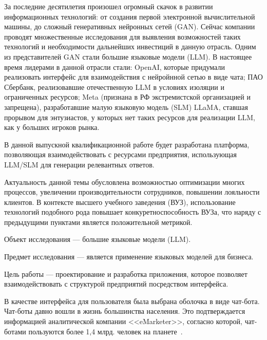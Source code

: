 







За последние десятилетия произошел огромный скачок в развитии информационных технологий:
от создания первой электронной вычислительной машины, до сложный генеративных
нейронных сетей (GAN). Сейчас компании проводят множественные исследования
для выявления возможностей таких технологий и необходимости дальнейших
инвестиций в данную отрасль. Одним из представителей GAN стали большие языковые
модели (LLM). В настоящее время лидерами в данной отрасли стали: OpenAI,
которые придумали реализовать интерфейс для взаимодействия с нейройнной сетью 
в виде чата; ПАО Сбербанк, реализовавшие отечественную LLM в условиях изоляции
и ограниченных ресурсов; Meta (признана в РФ экстремистской организацией и 
запрещена), разработавшие малую языковую модель (SLM) LLaMA, ставшая прорывом 
для энтузиастов, у которых нет таких ресурсов для реализации LLM, как у 
больших игроков рынка.

В данной выпускной квалификационной работе 
будет разработана платформа, позволяющая взаимодействовать с ресурсами предприятия,
использующая LLM/SLM для генерации релевантных ответов.

Актуальность данной темы обусловлена возможностью оптимизации многих процессов, 
увеличении производительности сотрудников, повышении лояльности клиентов.
В контексте высшего учебного заведения (ВУЗ), использование технологий подобного рода
повышает конкуретноспособность ВУЗа, что наряду с предыдущими пунктами является
положительной метрикой.

Объект исследования --- большие языковые модели (LLM).

Предмет исследования --- является применение языковых моделей для бизнеса.

Цель работы --- проектирование и разработка приложения, которое позволяет
взаимодействовать с структурой предприятий посредством интерфейса.

В качестве интерфейса для пользователя была выбрана оболочка в виде чат-бота.
Чат-боты давно вошли в жизнь большинства населения. Это подтверждается 
информацией аналитической компании <<eMarketer>>, согласно которой, чат-ботами
пользуются более 1,4 млрд. человек на планете~\cite{botucount}.

